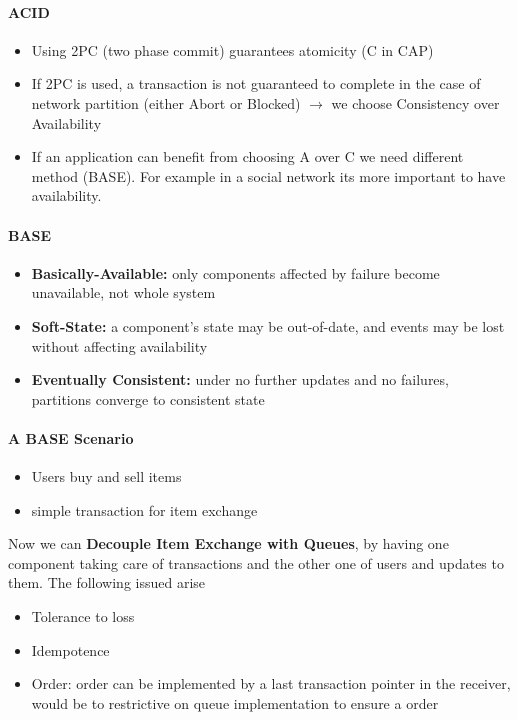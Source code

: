 \paragraph{ACID}
\begin{itemize}
\item Using 2PC (two phase commit) guarantees atomicity (C in CAP)
\item If 2PC is used, a transaction is not guaranteed to complete
  in the case of network partition (either Abort or Blocked)
  $\rightarrow$ we choose Consistency over Availability
\item If an application can benefit from choosing A over C
  we need different method (BASE). For example in a social network
  its more important to have availability.
\end{itemize}

\paragraph{BASE}
\begin{itemize}
\item \textbf{Basically-Available:} only components affected by failure
  become unavailable, not whole system
\item \textbf{Soft-State:} a component's state may be out-of-date,
  and events may be lost without affecting availability
\item \textbf{Eventually Consistent:} under no further updates and no
  failures, partitions converge to consistent state
\end{itemize}

\paragraph{A BASE Scenario}
\begin{itemize}
\item Users buy and sell items
\item simple transaction for item exchange
\end{itemize}

Now we can \textbf{Decouple Item Exchange with Queues},
by having one component taking care of transactions and
the other one of users and updates to them. The following
issued arise
\begin{itemize}
\item Tolerance to loss
\item Idempotence
\item Order: order can be implemented by a last transaction
  pointer in the receiver, would be to restrictive on queue implementation
  to ensure a order
\end{itemize}

